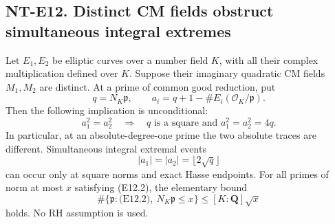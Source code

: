 \subsection*{NT-E12. Distinct CM fields obstruct simultaneous integral extremes}

Let \(E_1,E_2\) be elliptic curves over a number field \(K\),
with all their complex multiplication defined over \(K\).
Suppose their imaginary quadratic CM fields \(M_1,M_2\)
are distinct. At a prime of common good reduction, put
\[
 q=N_K\mathfrak p,\qquad
 a_i=q+1-\#E_i(\mathcal O_K/\mathfrak p).
 \]
Then the following implication is unconditional:
\[
            a_1^2=a_2^2
       \quad\Longrightarrow\quad
       q\text{ is a square and }a_1^2=a_2^2=4q.
                                                               \tag{E12.1}
\]
In particular, at an absolute-degree-one prime the two
absolute traces are different. Simultaneous integral
extremal events
\[
            |a_1|=|a_2|=\lfloor2\sqrt q\rfloor
                                                               \tag{E12.2}
\]
can occur only at square norms and exact Hasse endpoints.
For all primes of norm at most \(x\) satisfying (E12.2),
the elementary bound
\[
        \#\{\mathfrak p:\text{(E12.2)},\ N_K\mathfrak p\le x\}
                              \le [K:\mathbf Q]\sqrt x
                                                               \tag{E12.3}
\]
holds. No RH assumption is used.

